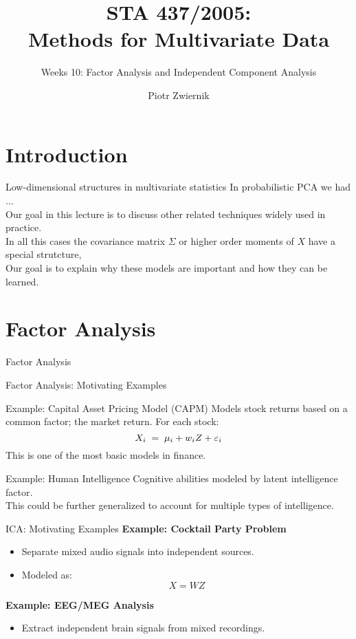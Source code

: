 \documentclass[11pt,handout,aspectratio=169]{beamer}
\title[STA437-Week1]{STA 437/2005: \\ Methods for Multivariate Data}
\subtitle[]{Weeks 10: Factor Analysis and Independent Component Analysis}
\author[Piotr Zwiernik]{Piotr Zwiernik}
\institute[UofT]{University of Toronto}
\date{}
\begin{document}
\maketitle
\section{Introduction}
\begin{frame}{Low-dimensional structures in multivariate statistics}
	In probabilistic PCA we had ...\\[5mm]
	
	Our goal in this lecture is to discuss other related techniques widely used in practice.\\[5mm]
	In all this cases the covariance matrix $\Sigma$ or higher order moments of $X$ have a special strutcture,  \\[5mm]
	Our goal is to explain why these models are important and how they can be learned.
\end{frame}

\section{Factor Analysis }

\begin{frame}{}
	\begin{center}
		{\Huge \alert{Factor Analysis}}
	\end{center}
\end{frame}

\begin{frame}{Factor Analysis: Motivating Examples}
\begin{block}{Example: Capital Asset Pricing Model (CAPM)}
	Models stock returns based on a common factor; the \alert{market return}. For each stock:
	\[ X_i \;=\; \mu_i + w_i Z + \varepsilon_i \]
This is one of the most basic models in finance.
\end{block}
\begin{alertblock}{Example: Human Intelligence}
	Cognitive abilities modeled by latent \alert{intelligence factor}.\\[3mm]
	This could be further generalized to account for multiple types of intelligence.
\end{alertblock}
\end{frame}

\begin{frame}{ICA: Motivating Examples}
    \textbf{Example: Cocktail Party Problem}
    \begin{itemize}
        \item Separate mixed audio signals into independent sources.
        \item Modeled as: \[ X = WZ \]
    \end{itemize}
    \textbf{Example: EEG/MEG Analysis}
    \begin{itemize}
        \item Extract independent brain signals from mixed recordings.
    \end{itemize}
\end{frame}
\end{document}
